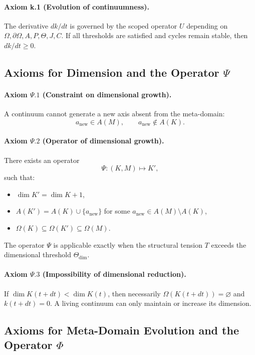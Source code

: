 \paragraph{Axiom k.1 (Evolution of continuumness).}
The derivative \(dk/dt\) is governed by the scoped operator \(U\) depending on \(\Omega,\partial\Omega,A,P,\Theta,J,C\).
If all thresholds are satisfied and cycles remain stable, then \(dk/dt\ge 0\).

\subsection{Axioms for Dimension and the Operator \texorpdfstring{\(\Psi\)}{\Psi}}

\paragraph{Axiom \texorpdfstring{\(\Psi.1\)}{\Psi.1} (Constraint on dimensional growth).}
A continuum cannot generate a new axis absent from the meta-domain:
\[
  a_{\mathrm{new}} \in A(M),\qquad a_{\mathrm{new}}\notin A(K).
\]

\paragraph{Axiom \texorpdfstring{\(\Psi.2\)}{\Psi.2} (Operator of dimensional growth).}
There exists an operator
\[
  \Psi : (K,M)\mapsto K',
\]
such that:
\begin{itemize}
  \item \(\dim K' = \dim K + 1\),
  \item \(A(K') = A(K)\cup\{a_{\mathrm{new}}\}\) for some \(a_{\mathrm{new}}\in A(M)\setminus A(K)\),
  \item \(\Omega(K)\subseteq \Omega(K')\subseteq \Omega(M)\).
\end{itemize}
The operator \(\Psi\) is applicable exactly when the structural tension \(T\) exceeds the dimensional threshold \(\Theta_{\mathrm{dim}}\).

\paragraph{Axiom \texorpdfstring{\(\Psi.3\)}{\Psi.3} (Impossibility of dimensional reduction).}
If \(\dim K(t+dt)<\dim K(t)\), then necessarily \(\Omega(K(t+dt))=\varnothing\) and \(k(t+dt)=0\).
A living continuum can only maintain or increase its dimension.

\subsection{Axioms for Meta-Domain Evolution and the Operator \texorpdfstring{\(\Phi\)}{\Phi}}

